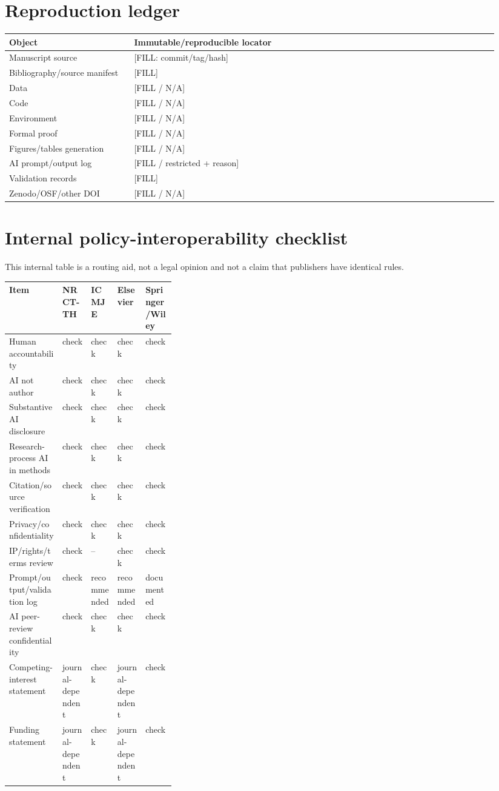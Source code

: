 \documentclass[11pt]{article}
\begin{document}
\section{Reproduction ledger}
\label{app:reproduction}

\begin{longtable}{@{}p{0.24\linewidth}p{0.70\linewidth}@{}}
\toprule
Object & Immutable/reproducible locator\\
\midrule
\endhead
Manuscript source & [FILL: commit/tag/hash]\\
Bibliography/source manifest & [FILL]\\
Data & [FILL / N/A]\\
Code & [FILL / N/A]\\
Environment & [FILL / N/A]\\
Formal proof & [FILL / N/A]\\
Figures/tables generation & [FILL / N/A]\\
AI prompt/output log & [FILL / restricted + reason]\\
Validation records & [FILL]\\
Zenodo/OSF/other DOI & [FILL / N/A]\\
\bottomrule
\end{longtable}

\section{Internal policy-interoperability checklist}
\label{app:policy-map}

This internal table is a routing aid, not a legal opinion and not a claim that
publishers have identical rules.

\begin{tabularx}{\linewidth}{@{}p{0.32\linewidth}XXXX@{}}
\toprule
Item & NRCT-TH & ICMJE & Elsevier & Springer/Wiley\\
\midrule
Human accountability & check & check & check & check\\
AI not author & check & check & check & check\\
Substantive AI disclosure & check & check & check & check\\
Research-process AI in methods & check & check & check & check\\
Citation/source verification & check & check & check & check\\
Privacy/confidentiality & check & check & check & check\\
IP/rights/terms review & check & -- & check & check\\
Prompt/output/validation log & check & recommended & recommended & documented\\
AI peer-review confidentiality & check & check & check & check\\
Competing-interest statement & journal-dependent & check & journal-dependent & check\\
Funding statement & journal-dependent & check & journal-dependent & check\\
\bottomrule
\end{tabularx}
\end{document}
